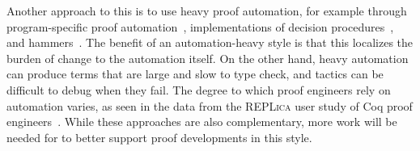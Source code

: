 Another approach to this is to use heavy proof automation, for example through
program-specific proof automation~\cite{Chlipala:2013:CPD:2584504},
implementations of decision procedures~\cite{Pugh1991},
and hammers~\cite{Blanchette2016b, Blanchette2013, Kaliszyk2014, Czajka2018}.
The benefit of an automation-heavy style is that this localizes the burden of change to the automation itself.
On the other hand, heavy automation can produce terms that are large and slow to type check,
and tactics can be difficult to debug when they fail.
The degree to which proof engineers rely on automation varies, as seen in the data from the
\textsc{REPLica} user study of Coq proof engineers~\cite{replica}.
While these approaches are also complementary, more work will be needed for \toolname to better support 
proof developments in this style.



